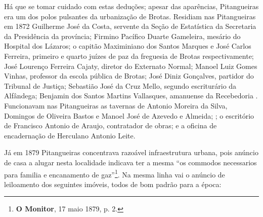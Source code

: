 Há que se tomar cuidado com estas deduções; apesar das aparências, Pitangueiras era um dos polos pulsantes da urbanização de Brotas. Residiam nas Pitangueiras em 1872 Guilherme José da Costa, servente da Seção de Estatística da Secretaria da Presidência da província; Firmino Pacífico Duarte Gameleira, mesário do Hospital dos Lázaros; o capitão Maximiniano dos Santos Marques e José Carlos Ferreira, primeiro e quarto juízes de paz da freguesia de Brotas respectivamente; José Lourenço Ferreira Cajaty, diretor do Externato Normal; Manoel Luiz Gomes Vinhas, professor da escola pública de Brotas; José Diniz Gonçalves, partidor do Tribunal de Justiça; Sebastião José da Cruz Mello, segundo escriturário da Alfândega; Benjamin dos Santos Martins Vallasques, amanuense da Recebedoria \cite[segunda~parte, pp.~59, 85, 90, 91, 97, 98, 128, 167, 180]{pimenta_almanak_1872}. Funcionavam nas Pitangueiras as tavernas de Antonio Moreira da Silva, Domingos de Oliveira Bastos e Manoel José de Azevedo e Almeida; \cite[terceira~parte, pp.~40, 41, 48]{pimenta_almanak_1872}; o escritório de Francisco Antonio de Araujo, contratador de obras; e a oficina de encadernação de Herculano Antonio Leite\cite[quarta~parte, pp.~12, 39]{pimenta_almanak_1872}.

Já em 1879 Pitangueiras concentrava razoável infraestrutura urbana, pois anúncio de casa a alugar nesta localidade indicava ter a mesma ``os commodos necessarios para familia e encanamento de gaz''\footnote{\textbf{O Monitor}, 17 maio 1879, p. 2.}. Na mesma linha vai o anúncio de leiloamento dos seguintes imóveis, todos de bom padrão para a época:

